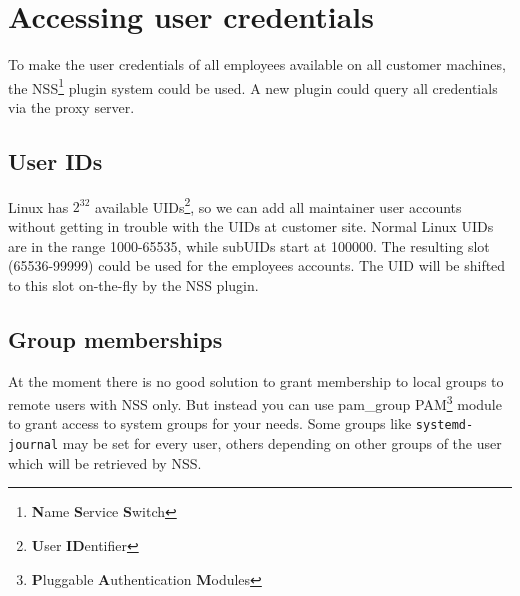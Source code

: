 %
%
%
%
%
%
%


\section{Accessing user credentials}

To make the user credentials of all employees available on all customer
machines, the NSS\footnote{\textbf{N}ame \textbf{S}ervice \textbf{S}witch}
plugin system could be used. A new plugin could query all credentials via the
proxy server.


\subsection{User IDs}

Linux has $2^{32}$ available UIDs\footnote{\textbf{U}ser \textbf{ID}entifier},
so we can add all maintainer user accounts without getting in trouble with the
UIDs at customer site. Normal Linux UIDs are in the range 1000-65535, while
subUIDs start at 100000. The resulting slot (65536-99999) could be used for the
employees accounts. The UID will be shifted to this slot on-the-fly by the NSS
plugin.


\subsection{Group memberships}

At the moment there is no good solution to grant membership to local groups to
remote users with NSS only. But instead you can use pam\_group
PAM\footnote{\textbf{P}luggable \textbf{A}uthentication \textbf{M}odules} module
to grant access to system groups for your needs. Some groups like
\verb+systemd-journal+ may be set for every user, others depending on other
groups of the user which will be retrieved by NSS.
